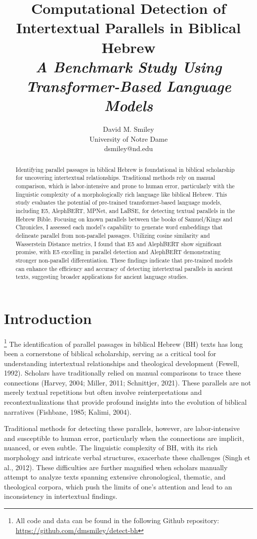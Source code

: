 \documentclass[12pt]{article}
\title{
    \LARGE\bfseries
    Computational Detection of \\
    Intertextual Parallels in Biblical Hebrew \\[1.2ex]
    \Large\itshape
    A Benchmark Study Using \\ Transformer-Based Language Models
}
\author{David M. Smiley\\University of Notre Dame\\dsmiley@nd.edu}
\date{}
\begin{document}
\maketitle

\begin{abstract}
Identifying parallel passages in biblical Hebrew is foundational in biblical scholarship for uncovering intertextual relationships. Traditional methods rely on manual comparison, which is labor-intensive and prone to human error, particularly with the linguistic complexity of a morphologically rich language like biblical Hebrew. This study evaluates the potential of pre-trained transformer-based language models, including E5, AlephBERT, MPNet, and LaBSE, for detecting textual parallels in the Hebrew Bible. Focusing on known parallels between the books of Samuel/Kings and Chronicles, I assessed each model’s capability to generate word embeddings that delineate parallel from non-parallel passages. Utilizing cosine similarity and Wasserstein Distance metrics, I found that E5 and AlephBERT show significant promise, with E5 excelling in parallel detection and AlephBERT demonstrating stronger non-parallel differentiation. These findings indicate that pre-trained models can enhance the efficiency and accuracy of detecting intertextual parallels in ancient texts, suggesting broader applications for ancient language studies. \end{abstract}

\section{Introduction}
\footnote{All code and data can be found in the following Github repository: \url{https://github.com/dmsmiley/detect-bh}}
The identification of parallel passages in biblical Hebrew (BH) texts has long been a cornerstone of biblical scholarship, serving as a critical tool for understanding intertextual relationships and theological development (Fewell, 1992). Scholars have traditionally relied on manual comparisons to trace these connections (Harvey, 2004; Miller, 2011; Schnittjer, 2021). These parallels are not merely textual repetitions but often involve reinterpretations and recontextualizations that provide profound insights into the evolution of biblical narratives (Fishbane, 1985; Kalimi, 2004).

Traditional methods for detecting these parallels, however, are labor-intensive and susceptible to human error, particularly when the connections are implicit, nuanced, or even subtle. The linguistic complexity of BH, with its rich morphology and intricate verbal structures, exacerbate these challenges (Singh et al., 2012). These difficulties are further magnified when scholars manually attempt to analyze texts spanning extensive chronological, thematic, and theological corpora, which push the limits of one’s attention and lead to an inconsistency in intertextual findings.
\end{document}
